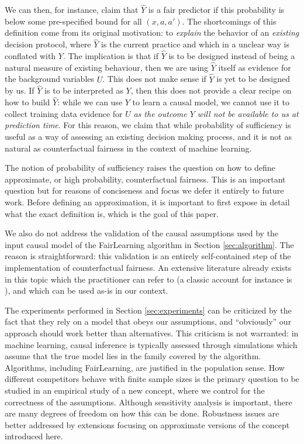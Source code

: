 We can then, for instance, claim that $\hat Y$ is a fair predictor if
this probability is below some pre-specified bound for all $(x, a,
a')$. The shortcomings of this definition come from its original
motivation: to {\it explain} the behavior of an {\it existing}
decision protocol, where $\hat Y$ is the current practice and which in a
unclear way is conflated with $Y$. The implication is that if $\hat Y$
is to be designed instead of being a natural measure of existing
behaviour, then we are using $\hat Y$ itself as evidence for the
background variables $U$. This does not make sense if $\hat Y$ is
yet to be designed by us. If $\hat Y$ is to be interpreted as $Y$, then this
does not provide a clear recipe on how to build $\hat Y$: while we can
use $Y$ to learn a causal model, we cannot use it to collect training
data evidence for $U$ {\it as the outcome $Y$ will not be available to
  us at prediction time}. For this reason, we claim that while
probability of sufficiency is useful as a way of assessing an existing
decision making process, and it is not as natural as counterfactual
fairness in the context of machine learning.

 The notion
of probability of sufficiency raises the question on how to define
approximate, or high probability, counterfactual fairness. This is an
important question but for reasons of conciseness and focus we defer
it entirely to future work. Before defining an approximation, it is
important to first expose in detail what the exact definition is,
which is the goal of this paper.

We also do not address the validation of the causal assumptions used
by the input causal model of the {\sc FairLearning} algorithm in
Section \ref{sec:algorithm}. The reason is straightforward: this
validation is an entirely self-contained step of the implementation of
counterfactual fairness. An extensive literature already exists in
this topic which the practitioner can refer to (a classic account for
instance is \cite{bollen:93}), and which can be used as-is in our
context.

The experiments performed in Section \ref{sec:experiments} can be
criticized by the fact that they rely on a model that obeys our
assumptions, and ``obviously'' our approach should work better than
alternatives. This criticism is not warranted: in machine learning,
causal inference is typically assessed through simulations which
assume that the true model lies in the family covered by the
algorithm.  Algorithms, including {\sc FairLearning}, are justified in
the population sense. How different competitors behave with finite
sample sizes is the primary question to be studied in an empirical
study of a new concept, where we control for the correctness of the
assumptions. Although sensitivity analysis is important, there are
many degrees of freedom on how this can be done. Robustness issues are
better addressed by extensions focusing on approximate versions of the
concept introduced here.

